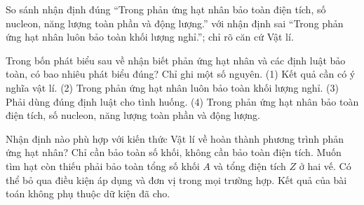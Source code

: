 \begin{bt}
So sánh nhận định đúng “Trong phản ứng hạt nhân bảo toàn điện tích, số nucleon, năng lượng toàn phần và động lượng.” với nhận định sai “Trong phản ứng hạt nhân luôn bảo toàn khối lượng nghỉ.”; chỉ rõ căn cứ Vật lí.
\end{bt}

\begin{ex}
Trong bốn phát biểu sau về nhận biết phản ứng hạt nhân và các định luật bảo toàn, có bao nhiêu phát biểu đúng? Chỉ ghi một số nguyên. (1) Kết quả cần có ý nghĩa vật lí. (2) Trong phản ứng hạt nhân luôn bảo toàn khối lượng nghỉ. (3) Phải dùng đúng định luật cho tình huống. (4) Trong phản ứng hạt nhân bảo toàn điện tích, số nucleon, năng lượng toàn phần và động lượng.
\end{ex}

\begin{ex}
Nhận định nào phù hợp với kiến thức Vật lí về hoàn thành phương trình phản ứng hạt nhân?
\choice
{Chỉ cần bảo toàn số khối, không cần bảo toàn điện tích.}
{\True Muốn tìm hạt còn thiếu phải bảo toàn tổng số khối $A$ và tổng điện tích $Z$ ở hai vế.}
{Có thể bỏ qua điều kiện áp dụng và đơn vị trong mọi trường hợp.}
{Kết quả của bài toán không phụ thuộc dữ kiện đã cho.}
\end{ex}

